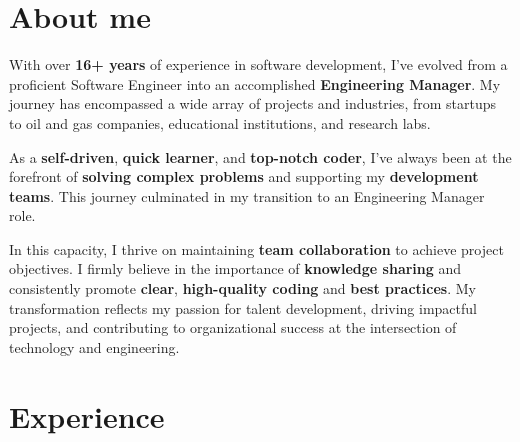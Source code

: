 \documentclass[11pt,a4paper,sans]{moderncv}
\begin{document}
\makecvtitle

\section{About me}

With over \textbf{16+ years} of experience in software development, I've
evolved from a proficient Software Engineer into an accomplished
\textbf{Engineering Manager}. My journey has encompassed a wide array of
projects and industries, from startups to oil and gas companies,
educational institutions, and research labs.

\vspace{1em}
As a \textbf{self-driven}, \textbf{quick learner}, and \textbf{top-notch
coder}, I've always been at the forefront of \textbf{solving complex
problems} and supporting my \textbf{development teams}. This journey
culminated in my transition to an Engineering Manager role.

\vspace{1em}
In this capacity, I thrive on maintaining \textbf{team collaboration} to
achieve project objectives. I firmly believe in the importance of
\textbf{knowledge sharing} and consistently promote \textbf{clear},
\textbf{high-quality coding} and \textbf{best practices}. My
transformation reflects my passion for talent development, driving
impactful projects, and contributing to organizational success at the
intersection of technology and engineering.


\clearpage

\section{Experience}


\end{document}
